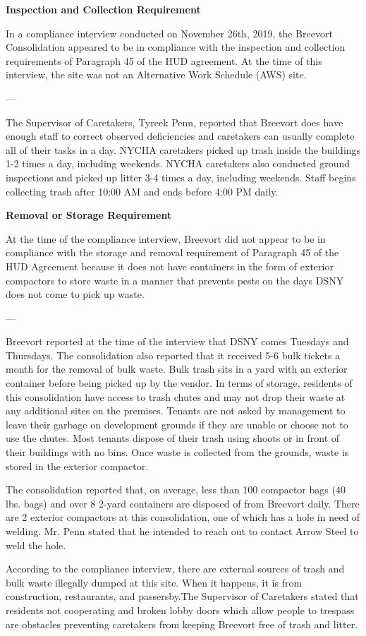 

\textbf{Inspection and Collection Requirement}

In a compliance interview conducted on November 26th, 2019, the Breevort Consolidation appeared to be in compliance with the inspection and collection requirements of Paragraph 45 of the HUD agreement. At the time of this interview, the site was not an Alternative Work Schedule (AWS) site. 

---

The Supervisor of Caretakers, Tyreek Penn, reported that Breevort does have enough staff to correct observed deficiencies and caretakers can usually complete all of their tasks in a day. NYCHA caretakers picked up trash inside the buildings 1-2 times a day, including weekends. NYCHA caretakers also conducted ground inspections and picked up litter 3-4 times a day, including weekends. Staff begins collecting trash after 10:00 AM and ends before 4:00 PM daily.

\textbf{Removal or Storage Requirement}

At the time of the compliance interview, Breevort did not appear to be in compliance with the storage and removal requirement of Paragraph 45 of the HUD Agreement because it does not have containers in the form of exterior compactors to store waste in a manner that prevents pests on the days DSNY does not come to pick up waste. 

---

Breevort reported at the time of the interview that DSNY comes Tuesdays and Thursdays. The consolidation also reported that it received 5-6 bulk tickets a month for the removal of bulk waste. Bulk trash sits in a yard with an exterior container before being picked up by the vendor. In terms of storage, residents of this consolidation have access to trash chutes and may not drop their waste at any additional sites on the premises. Tenants are not asked by management to leave their garbage on development grounds if they are unable or choose not to use the chutes. Most tenants dispose of their trash using shoots or in front of their buildings with no bins. Once waste is collected from the grounds, waste is stored in the exterior compactor. 

The consolidation reported that, on average, less than 100 compactor bags (40 lbs. bags) and over 8 2-yard containers are disposed of from Breevort daily. There are 2 exterior compactors at this consolidation, one of which has a hole in need of welding. Mr. Penn stated that he intended to reach out to contact Arrow Steel to weld the hole.

According to the compliance interview, there are external sources of trash and bulk waste illegally dumped at this site. When it happens, it is from construction, restaurants, and passersby.The Supervisor of Caretakers stated that residents not cooperating and broken lobby doors which allow people to trespass are obstacles preventing caretakers from keeping Breevort free of trash and litter. 